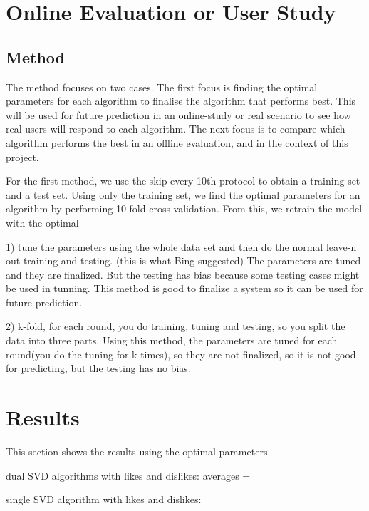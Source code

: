 \section{Online Evaluation or User Study}

\subsection{Method}

The method focuses on two cases. The first focus is finding the optimal parameters for each algorithm to finalise the algorithm that performs best. This will be used for future prediction in an online-study or real scenario to see how real users will respond to each algorithm. The next focus is to compare which algorithm performs the best in an offline evaluation, and in the context of this project.

For the first method, we use the skip-every-10th protocol to obtain a training set and a test set. Using only the training set, we find the optimal parameters for an algorithm by performing 10-fold cross validation. From this, we retrain the model with the optimal 


1) tune the parameters using the whole data set and then do the normal leave-n out training and testing. (this is what Bing suggested) The parameters are tuned and they are finalized. But the testing has bias because some testing cases might be used in tunning. This method is good to finalize a system so it can be used for future prediction.

2) k-fold, for each round, you do training, tuning and testing, so you split the data into three parts. Using this method, the parameters are tuned for each round(you do the tuning for k times), so they are not finalized, so it is not good for predicting, but the testing has no bias.


\section{Results}

This section shows the results using the optimal parameters. 

dual SVD algorithms with likes and dislikes:
averages = 

single SVD algorithm with likes and dislikes:



